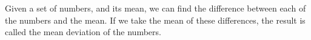 Given a set of numbers, and its mean, we can find the difference between
each of the numbers and the mean. If we take the mean of these
differences, the result is called the mean deviation of the numbers.